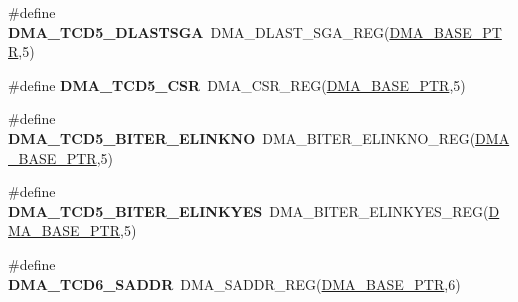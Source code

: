\begin{DoxyCompactItemize}
\item 
\hypertarget{group___d_m_a___register___accessor___macros_ga48b181f26b13735d9b3d366f746b0995}{}\#define {\bfseries D\+M\+A\+\_\+\+T\+C\+D5\+\_\+\+D\+L\+A\+S\+T\+S\+G\+A}~D\+M\+A\+\_\+\+D\+L\+A\+S\+T\+\_\+\+S\+G\+A\+\_\+\+R\+E\+G(\hyperlink{group___d_m_a___peripheral_ga6997fbc1b1973e9f27170217a3bd6f22}{D\+M\+A\+\_\+\+B\+A\+S\+E\+\_\+\+P\+T\+R},5)\label{group___d_m_a___register___accessor___macros_ga48b181f26b13735d9b3d366f746b0995}

\item 
\hypertarget{group___d_m_a___register___accessor___macros_ga21f0f7acf8241ec5707391950832b8bf}{}\#define {\bfseries D\+M\+A\+\_\+\+T\+C\+D5\+\_\+\+C\+S\+R}~D\+M\+A\+\_\+\+C\+S\+R\+\_\+\+R\+E\+G(\hyperlink{group___d_m_a___peripheral_ga6997fbc1b1973e9f27170217a3bd6f22}{D\+M\+A\+\_\+\+B\+A\+S\+E\+\_\+\+P\+T\+R},5)\label{group___d_m_a___register___accessor___macros_ga21f0f7acf8241ec5707391950832b8bf}

\item 
\hypertarget{group___d_m_a___register___accessor___macros_ga16a45975974259d9c0822a80fc4235b5}{}\#define {\bfseries D\+M\+A\+\_\+\+T\+C\+D5\+\_\+\+B\+I\+T\+E\+R\+\_\+\+E\+L\+I\+N\+K\+N\+O}~D\+M\+A\+\_\+\+B\+I\+T\+E\+R\+\_\+\+E\+L\+I\+N\+K\+N\+O\+\_\+\+R\+E\+G(\hyperlink{group___d_m_a___peripheral_ga6997fbc1b1973e9f27170217a3bd6f22}{D\+M\+A\+\_\+\+B\+A\+S\+E\+\_\+\+P\+T\+R},5)\label{group___d_m_a___register___accessor___macros_ga16a45975974259d9c0822a80fc4235b5}

\item 
\hypertarget{group___d_m_a___register___accessor___macros_ga07c9d47975d63acab5c79b21b8fa0631}{}\#define {\bfseries D\+M\+A\+\_\+\+T\+C\+D5\+\_\+\+B\+I\+T\+E\+R\+\_\+\+E\+L\+I\+N\+K\+Y\+E\+S}~D\+M\+A\+\_\+\+B\+I\+T\+E\+R\+\_\+\+E\+L\+I\+N\+K\+Y\+E\+S\+\_\+\+R\+E\+G(\hyperlink{group___d_m_a___peripheral_ga6997fbc1b1973e9f27170217a3bd6f22}{D\+M\+A\+\_\+\+B\+A\+S\+E\+\_\+\+P\+T\+R},5)\label{group___d_m_a___register___accessor___macros_ga07c9d47975d63acab5c79b21b8fa0631}

\item 
\hypertarget{group___d_m_a___register___accessor___macros_ga0f41c78fcfe67fb12a25ecf7df8f9127}{}\#define {\bfseries D\+M\+A\+\_\+\+T\+C\+D6\+\_\+\+S\+A\+D\+D\+R}~D\+M\+A\+\_\+\+S\+A\+D\+D\+R\+\_\+\+R\+E\+G(\hyperlink{group___d_m_a___peripheral_ga6997fbc1b1973e9f27170217a3bd6f22}{D\+M\+A\+\_\+\+B\+A\+S\+E\+\_\+\+P\+T\+R},6)\label{group___d_m_a___register___accessor___macros_ga0f41c78fcfe67fb12a25ecf7df8f9127}


\end{DoxyCompactItemize}
